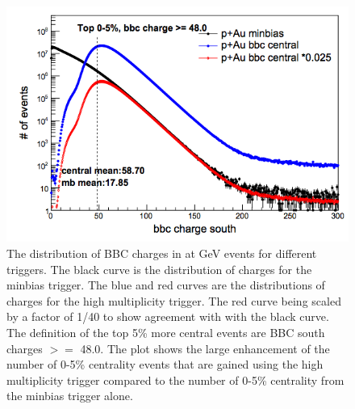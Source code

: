 \begin{figure}[h!]
\begin{center}
\includegraphics[scale=0.55]{figs/pAu_centrality_trigger.png}
\end{center}
\caption{The distribution of BBC charges in \pau at  GeV events for different triggers. The black curve is the distribution of charges for the minbias trigger. The blue and red curves are the distributions of charges for the high multiplicity trigger. The red curve being scaled by a factor of 1/40 to show agreement with with the black curve. The definition of the top 5\% more central events are BBC south charges $>=$ 48.0. The plot shows the large enhancement of the number of 0-5\% centrality events that are gained using the high multiplicity trigger compared to the number of 0-5\% centrality from the minbias trigger alone.}\label{fig:pau_centrality_trig}

\end{figure}

